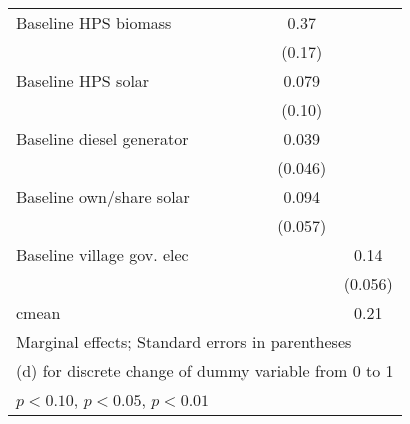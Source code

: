 \begin{table}[htbp]
\begin{tabular*}{1\hsize}{@{\hskip\tabcolsep\extracolsep\fill}l*{6}{c}}
Baseline HPS biomass&                  &                  &                  &                  &     0.37\sym{**} &                  \\
                &                  &                  &                  &                  &   (0.17)         &                  \\
Baseline HPS solar&                  &                  &                  &                  &    0.079         &                  \\
                &                  &                  &                  &                  &   (0.10)         &                  \\
Baseline diesel generator&                  &                  &                  &                  &    0.039         &                  \\
                &                  &                  &                  &                  &  (0.046)         &                  \\
Baseline own/share solar&                  &                  &                  &                  &    0.094         &                  \\
                &                  &                  &                  &                  &  (0.057)         &                  \\
Baseline village gov. elec&                  &                  &                  &                  &                  &     0.14\sym{**} \\
                &                  &                  &                  &                  &                  &  (0.056)         \\
\midrule
cmean           &                  &                  &                  &                  &                  &     0.21         \\
\bottomrule
\multicolumn{7}{l}{\footnotesize Marginal effects; Standard errors in parentheses}\\
\multicolumn{7}{l}{\footnotesize  (d) for discrete change of dummy variable from 0 to 1}\\
\multicolumn{7}{l}{\footnotesize \sym{*} \(p<0.10\), \sym{**} \(p<0.05\), \sym{***} \(p<0.01\)}\\
\end{tabular*}
\end{table}

